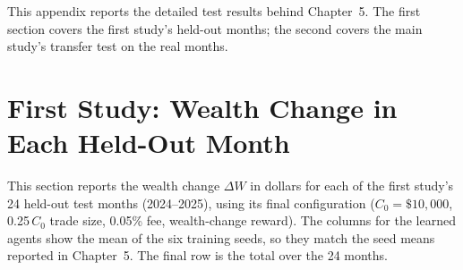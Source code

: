 
This appendix reports the detailed test results behind Chapter~5. The
first section covers the first study's held-out months; the second
covers the main study's transfer test on the real months.

\section{First Study: Wealth Change in Each Held-Out Month}

This section reports the wealth change \(\Delta W\) in dollars for each
of the first study's 24 held-out test months (2024--2025), using its
final configuration (\(C_0 = \$10{,}000\), 0.25\,\(C_0\) trade size,
0.05\% fee, wealth-change reward). The columns for the learned agents
show the mean of the six training seeds, so they match the seed means
reported in Chapter~5. The final row is the total over the 24 months.


